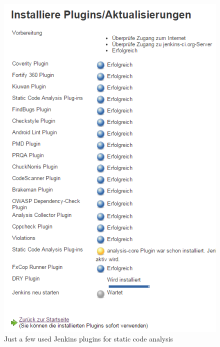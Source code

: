 \documentclass[conference]{IEEEtran}
\begin{document}
\begin{figure}[!t]
	\centering
	\includegraphics[width=1\linewidth]{img/jenkins-code-analysis-plugins.png}
	\caption{Just a few used Jenkins plugins for static code analysis}
	\label{fig:jenkins-plugins}
\end{figure}
\end{document}
